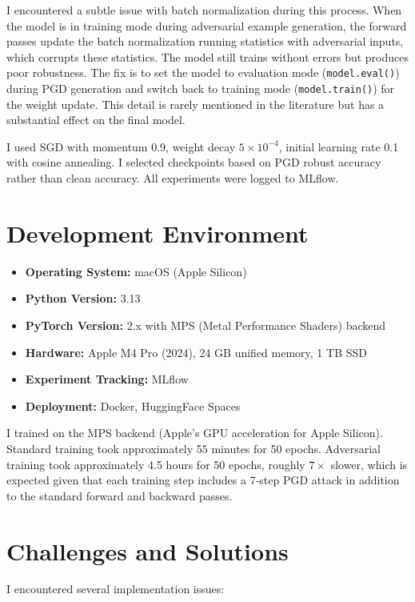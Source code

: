 I encountered a subtle issue with batch normalization during this process. When the model is in training mode during adversarial example generation, the forward passes update the batch normalization running statistics with adversarial inputs, which corrupts these statistics. The model still trains without errors but produces poor robustness. The fix is to set the model to evaluation mode (\texttt{model.eval()}) during PGD generation and switch back to training mode (\texttt{model.train()}) for the weight update. This detail is rarely mentioned in the literature but has a substantial effect on the final model.

I used SGD with momentum 0.9, weight decay $5 \times 10^{-4}$, initial learning rate 0.1 with cosine annealing. I selected checkpoints based on PGD robust accuracy rather than clean accuracy. All experiments were logged to MLflow.

\section{Development Environment}

\begin{itemize}
    \item \textbf{Operating System:} macOS (Apple Silicon)
    \item \textbf{Python Version:} 3.13
    \item \textbf{PyTorch Version:} 2.x with MPS (Metal Performance Shaders) backend
    \item \textbf{Hardware:} Apple M4 Pro (2024), 24 GB unified memory, 1 TB SSD
    \item \textbf{Experiment Tracking:} MLflow
    \item \textbf{Deployment:} Docker, HuggingFace Spaces
\end{itemize}

I trained on the MPS backend (Apple's GPU acceleration for Apple Silicon). Standard training took approximately 55 minutes for 50 epochs. Adversarial training took approximately 4.5 hours for 50 epochs, roughly $7\times$ slower, which is expected given that each training step includes a 7-step PGD attack in addition to the standard forward and backward passes.

\section{Challenges and Solutions}

I encountered several implementation issues:

